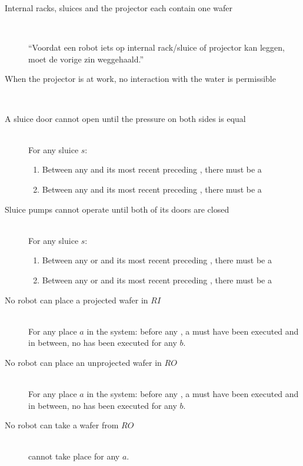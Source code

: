 \begin{description}
 
 \item[Internal racks, sluices and the projector each contain one wafer] \hfill \\
 
 ``Voordat een robot iets op internal rack/sluice of projector kan leggen, moet de vorige zin weggehaald.''
 
 \item[When the projector is at work, no interaction with the water is permissible] \hfill \\
 
 
 
 \item[A sluice door cannot open until the pressure on both sides is equal] \hfill \\
 For any sluice $s$:
 \begin{enumerate}
  \item Between any  and its most recent preceding , there must be a 
  \item Between any  and its most recent preceding , there must be a 
 \end{enumerate}

 \item[Sluice pumps cannot operate until both of its doors are closed] \hfill \\
 For any sluice $s$:
 \begin{enumerate}
  \item Between any  or  and its most recent preceding , there must be a 
  \item Between any  or  and its most recent preceding , there must be a 
 \end{enumerate}

\item[No robot can place a projected wafer in $RI$] \hfill \\
For any place $a$ in the system: before any , a  must have been executed and in between, no  has been executed for any $b$.

\item[No robot can place an unprojected wafer in $RO$] \hfill \\
For any place $a$ in the system: before any , a  must have been executed and in between, no  has been executed for any $b$.

\item[No robot can take a wafer from $RO$] \hfill \\
 cannot take place for any $a$.
 
\end{description}
